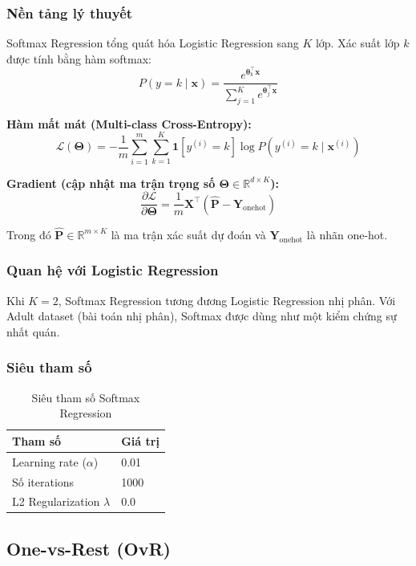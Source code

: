 \documentclass[12pt, a4paper]{article}
\begin{document}
\subsubsection{Nền tảng lý thuyết}

Softmax Regression tổng quát hóa Logistic Regression sang $K$ lớp. Xác suất lớp $k$ được tính bằng hàm softmax:
$$P(y=k \mid \mathbf{x}) = \frac{e^{\boldsymbol{\theta}_k^\top \mathbf{x}}}{\sum_{j=1}^{K} e^{\boldsymbol{\theta}_j^\top \mathbf{x}}}$$

\textbf{Hàm mất mát (Multi-class Cross-Entropy):}
$$\mathcal{L}(\boldsymbol{\Theta}) = -\frac{1}{m}\sum_{i=1}^{m}\sum_{k=1}^{K} \mathbf{1}[y^{(i)}=k]\log P(y^{(i)}=k \mid \mathbf{x}^{(i)})$$

\textbf{Gradient (cập nhật ma trận trọng số $\boldsymbol{\Theta} \in \mathbb{R}^{d \times K}$):}
$$\frac{\partial \mathcal{L}}{\partial \boldsymbol{\Theta}} = \frac{1}{m}\mathbf{X}^\top(\hat{\mathbf{P}} - \mathbf{Y}_{\text{onehot}})$$

Trong đó $\hat{\mathbf{P}} \in \mathbb{R}^{m \times K}$ là ma trận xác suất dự đoán và $\mathbf{Y}_{\text{onehot}}$ là nhãn one-hot.

\subsubsection{Quan hệ với Logistic Regression}
Khi $K=2$, Softmax Regression tương đương Logistic Regression nhị phân. Với Adult dataset (bài toán nhị phân), Softmax được dùng như một kiểm chứng sự nhất quán.

\subsubsection{Siêu tham số}
\begin{table}[H]
  \centering
  \caption{Siêu tham số Softmax Regression}
  \begin{tabular}{ll}
    \toprule
    \textbf{Tham số} & \textbf{Giá trị} \\
    \midrule
    Learning rate ($\alpha$) & 0.01 \\
    Số iterations & 1000 \\
    L2 Regularization $\lambda$ & 0.0 \\
    \bottomrule
  \end{tabular}
\end{table}


\subsection{One-vs-Rest (OvR)}
\label{ssec:ovr}
\end{document}
